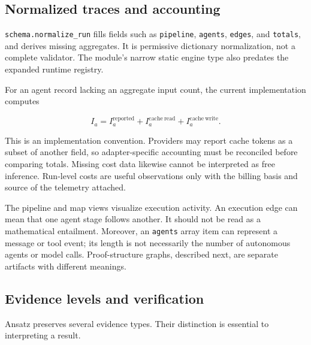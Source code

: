 \documentclass[10pt,letterpaper]{article}
\begin{document}
\subsection{Normalized traces and accounting}

\nolinkurl{schema.normalize_run} fills fields such as \nolinkurl{pipeline}, \nolinkurl{agents}, \nolinkurl{edges}, and \nolinkurl{totals}, and derives missing aggregates. It is permissive dictionary normalization, not a complete validator. The module's narrow static engine type also predates the expanded runtime registry.

For an agent record lacking an aggregate input count, the current implementation computes

\[
I_a=I_a^{\mathrm{reported}}+I_a^{\mathrm{cache\ read}}+I_a^{\mathrm{cache\ write}}.
\]

This is an implementation convention. Providers may report cache tokens as a subset of another field, so adapter-specific accounting must be reconciled before comparing totals. Missing cost data likewise cannot be interpreted as free inference. Run-level costs are useful observations only with the billing basis and source of the telemetry attached.

The pipeline and map views visualize execution activity. An execution edge can mean that one agent stage follows another. It should not be read as a mathematical entailment. Moreover, an \nolinkurl{agents} array item can represent a message or tool event; its length is not necessarily the number of autonomous agents or model calls. Proof-structure graphs, described next, are separate artifacts with different meanings.

\subsection{Evidence levels and verification}

Ansatz preserves several evidence types. Their distinction is essential to interpreting a result.
\end{document}
